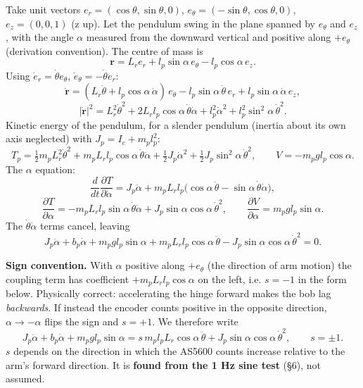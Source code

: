 \documentclass[11pt,a4paper]{article}
\begin{document}
Take unit vectors $e_r=(\cos\theta,\sin\theta,0)$, $e_\theta=(-\sin\theta,\cos\theta,0)$, $e_z=(0,0,1)$ (z up). Let the pendulum swing in the plane spanned by $e_\theta$ and $e_z$, with the angle $\alpha$ measured from the downward vertical and positive along $+e_\theta$ (derivation convention). The centre of mass is
\begin{equation*}
\mathbf r=L_r e_r+l_p\sin\alpha\,e_\theta-l_p\cos\alpha\,e_z .
\end{equation*}
Using $\dot e_r=\dot\theta e_\theta$, $\dot e_\theta=-\dot\theta e_r$:
\begin{equation*}
\dot{\mathbf r}=(L_r\dot\theta+l_p\cos\alpha\,\dot\alpha)\,e_\theta-l_p\sin\alpha\,\dot\theta\,e_r+l_p\sin\alpha\,\dot\alpha\,e_z,
\end{equation*}
\begin{equation*}
|\dot{\mathbf r}|^2=L_r^2\dot\theta^2+2L_rl_p\cos\alpha\,\dot\theta\dot\alpha+l_p^2\dot\alpha^2+l_p^2\sin^2\alpha\,\dot\theta^2 .
\end{equation*}
Kinetic energy of the pendulum, for a slender pendulum (inertia about its own axis neglected) with $J_p=I_c+m_pl_p^2$:
\begin{equation*}
T_p=\tfrac12 m_p L_r^2\dot\theta^2+m_pL_rl_p\cos\alpha\,\dot\theta\dot\alpha+\tfrac12 J_p\dot\alpha^2+\tfrac12 J_p\sin^2\alpha\,\dot\theta^2,
\qquad V=-m_pgl_p\cos\alpha .
\end{equation*}
The $\alpha$ equation:
\begin{equation*}
\frac{d}{dt}\frac{\partial T}{\partial\dot\alpha}=J_p\ddot\alpha+m_pL_rl_p\bigl(\cos\alpha\,\ddot\theta-\sin\alpha\,\dot\theta\dot\alpha\bigr),
\end{equation*}
\begin{equation*}
\frac{\partial T}{\partial\alpha}=-m_pL_rl_p\sin\alpha\,\dot\theta\dot\alpha+J_p\sin\alpha\cos\alpha\,\dot\theta^2,\qquad
\frac{\partial V}{\partial\alpha}=m_pgl_p\sin\alpha .
\end{equation*}
The $\dot\theta\dot\alpha$ terms cancel, leaving
\begin{equation*}
\boxed{J_p\ddot\alpha+b_p\dot\alpha+m_pgl_p\sin\alpha+m_pL_rl_p\cos\alpha\,\ddot\theta-J_p\sin\alpha\cos\alpha\,\dot\theta^2=0 .}
\end{equation*}

\textbf{Sign convention.} With $\alpha$ positive along $+e_\theta$ (the direction of arm motion) the coupling term has coefficient $+m_pL_rl_p\cos\alpha$ on the left, i.e. $s=-1$ in the form below. Physically correct: accelerating the hinge forward makes the bob lag \emph{backwards}. If instead the encoder counts positive in the opposite direction, $\alpha\to-\alpha$ flips the sign and $s=+1$. We therefore write
\begin{equation*}
J_p\ddot\alpha+b_p\dot\alpha+m_pgl_p\sin\alpha=s\,m_pl_pL_r\cos\alpha\,\ddot\theta+J_p\sin\alpha\cos\alpha\,\dot\theta^2,\qquad s=\pm1 .
\end{equation*}
$s$ depends on the direction in which the AS5600 counts increase relative to the arm's forward direction. It is \textbf{found from the 1 Hz sine test} (§6), not assumed.
\end{document}
